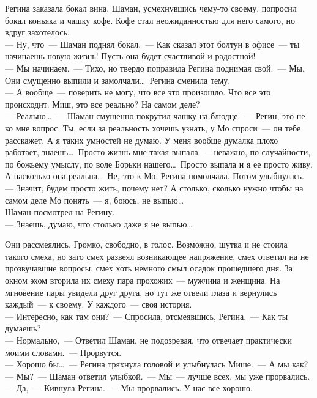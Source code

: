 Регина заказала бокал вина, Шаман, усмехнувшись чему-то своему, попросил бокал 
коньяка и чашку кофе. Кофе стал неожиданностью для него самого, но вдруг 
захотелось.\\
--- Ну, что~--- Шаман поднял бокал.~--- Как сказал этот болтун в офисе~--- ты 
начинаешь новую жизнь! Пусть она будет счастливой и радостной!\\
--- Мы начинаем.~--- Тихо, но твердо поправила Регина поднимая свой.~--- Мы. \\
Они смущенно выпили и замолчали\ldots\ Регина сменила тему.\\
--- А вообще~--- поверить не могу, что все это произошло. Что все это происходит. 
Миш, это все реально? На самом деле?\\
--- Реально\ldots~--- Шаман смущенно покрутил чашку на блюдце.~--- Регин, это не 
ко мне вопрос. Ты, если за реальность хочешь узнать, у Мо спроси~--- он тебе 
расскажет. А я таких умностей не думаю. У меня вообще думалка плохо работает, 
знаешь\ldots\ Просто жизнь мне такая выпала~--- неважно, по случайности, по божьему умыслу, по воле 
Борьки нашего\ldots\ Просто выпала и я ее просто живу. А насколько она 
реальна\ldots\ Не, это к Мо. Регина помолчала. Потом улыбнулась.\\
--- Значит, будем просто жить, почему нет? А столько, сколько нужно чтобы на 
самом деле Мо понять~--- я, боюсь, не выпью\ldots\\
Шаман посмотрел на Регину.\\
--- Знаешь, думаю, что столько даже я не выпью\ldots

Они рассмеялись. Громко, свободно, в голос. Возможно, шутка и не стоила такого 
смеха, но зато смех развеял возникающее напряжение, смех ответил на не 
прозвучавшие вопросы, смех хоть немного смыл осадок прошедшего дня. За окном 
эхом вторила их смеху пара прохожих~--- мужчина и женщина. На мгновение пары 
увидели друг друга, но тут же отвели глаза и вернулись каждый~--- к своему. У 
каждого~--- своя история.\\
--- Интересно, как там они?~--- Спросила, отсмеявшись, Регина.~--- Как ты думаешь?\\
--- Нормально,~--- Ответил Шаман, не подозревая, что отвечает практически моими 
словами.~--- Прорвутся.\\
--- Хорошо бы\ldots~--- Регина тряхнула головой и улыбнулась Мише.~--- А мы как?\\
--- Мы?~--- Шаман ответил улыбкой.~--- Мы~--- лучше всех, мы уже прорвались.\\
--- Да,~--- Кивнула Регина.~--- Мы прорвались. У нас все хорошо.

